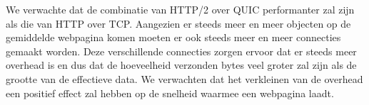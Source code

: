 \documentclass[fleqn,10pt]{voorstel}
\begin{document}
We verwachte dat de combinatie van HTTP/2 over QUIC performanter zal zijn als die van HTTP over TCP. Aangezien er steeds meer en meer objecten op de gemiddelde webpagina komen moeten er ook steeds meer en meer connecties gemaakt worden. Deze verschillende connecties zorgen ervoor dat er steeds meer overhead is en dus dat de hoeveelheid verzonden bytes veel groter zal zijn als de grootte van de effectieve data. We verwachten dat het verkleinen van de overhead een positief effect zal hebben op de snelheid waarmee een webpagina laadt. 

\printbibliography[heading=bibintoc]
\end{document}
